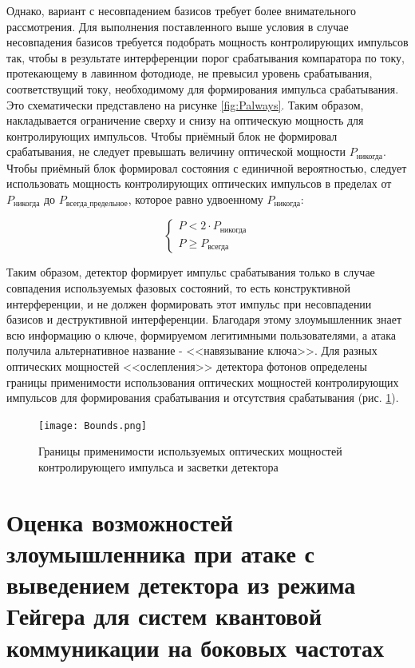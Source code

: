 Однако, вариант с несовпадением базисов требует более внимательного рассмотрения. Для выполнения поставленного выше условия в случае несовпадения базисов требуется подобрать мощность контролирующих импульсов так, чтобы в результате интерференции порог срабатывания компаратора по току, протекающему в лавинном фотодиоде, не превысил уровень срабатывания, соответствущий току, необходимому для формирования импульса срабатывания. Это схематически представлено на рисунке \ref{fig:Palways}. Таким образом, накладывается ограничение сверху и снизу на оптическую мощность для контролирующих импульсов. Чтобы приёмный блок не формировал срабатывания, не следует превышать величину оптической мощности $P_\text{никогда}$. Чтобы приёмный блок формировал состояния с единичной вероятностью, следует использовать мощность контролирующих оптических импульсов в пределах от $P_\text{никогда}$ до $P_\text{всегда\_предельное}$, которое равно удвоенному $P_\text{никогда}$:


\[
    \begin{cases}
     P < 2 \cdot P_\text{никогда} \\
     P \geqslant P_\text{всегда}
    \end{cases}
\]




Таким образом, детектор формирует импульс срабатывания только в случае совпадения используемых фазовых состояний, то есть конструктивной интерференции, и не должен формировать этот импульс при несовпадении базисов и деструктивной интерференции. Благодаря этому злоумышленник знает всю информацию о ключе, формируемом легитимными пользователями, а атака получила альтернативное название - <<навязывание ключа>>. Для разных оптических мощностей <<ослепления>> детектора фотонов определены границы применимости использования оптических мощностей контролирующих импульсов для формирования срабатывания и отсутствия срабатывания (рис. \ref{fig:Bounds}).  


 \begin{figure}[ht]
  \centering
  \texttt{[image: Bounds.png]}
  \caption{Границы применимости используемых оптических мощностей контролирующего импульса и засветки детектора}
  \label{fig:Bounds}
\end{figure}


\section{Оценка возможностей злоумышленника при атаке с выведением детектора из режима Гейгера для систем квантовой коммуникации на боковых частотах} \label{sec:ch3/sec3}
 
